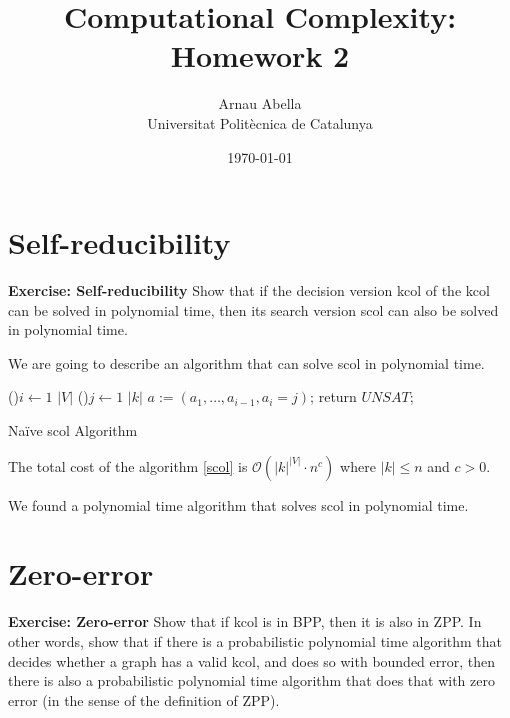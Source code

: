 \documentclass[12pt, a4paper]{article} %
\title{%
  Computational Complexity: Homework 2
}
\author{%
  Arnau Abella \\
  \large{Universitat Polit\`ecnica de Catalunya}
}
\date{\today}
\begin{document}
\maketitle


\section{Self-reducibility}

\textbf{Exercise: Self-reducibility} Show that if the decision version \acrshort{kcol} of the \acrfull{kcol} can be solved in polynomial time, then its search version \acrshort{scol} can also be solved in polynomial time.

We are going to describe an algorithm that can solve \acrshort{scol} in polynomial time.

\begin{algorithm}[H]
  \SetAlgoNoLine
  \BlankLine
  \For(){$i \leftarrow 1$ \KwTo $|V|$}{
    \For(){$j \leftarrow 1$ \KwTo $|k|$}{
      $a := (a_1,\dots,a_{i-1}, a_i = j)$;
    }
  }
  return $UNSAT$;
  \caption{Na\"ive \acrshort{scol} Algorithm}
  \label{scol}
\end{algorithm}

\newpage

The total cost of the algorithm \ref{scol} is $\mathcal{O}(|k|^{|V|} \cdot n^c)$ where $|k| \leq n$ and $c > 0$.

We found a polynomial time algorithm that solves \acrshort{scol} in polynomial time.


\section{Zero-error}

\textbf{Exercise: Zero-error} Show that if \acrshort{kcol} is in BPP, then it is also in ZPP. In other words, show that if there is a probabilistic polynomial time algorithm that decides whether a graph has a valid \acrshort{kcol}, and does so with bounded error, then there is also a probabilistic polynomial time algorithm that does that with zero error (in the sense of the definition of ZPP).
\end{document}
